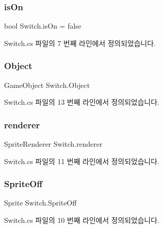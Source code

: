 \subsubsection{\texorpdfstring{isOn}{isOn}}
{\footnotesize\ttfamily bool Switch.\+is\+On = false}



Switch.\+cs 파일의 7 번째 라인에서 정의되었습니다.

\mbox{\label{class_switch_a0d13004c1df964c597024b601235f679}} 
\subsubsection{\texorpdfstring{Object}{Object}}
{\footnotesize\ttfamily Game\+Object Switch.\+Object}



Switch.\+cs 파일의 13 번째 라인에서 정의되었습니다.

\mbox{\label{class_switch_ae41569b4d13a765d054274eb2631016f}} 
\subsubsection{\texorpdfstring{renderer}{renderer}}
{\footnotesize\ttfamily Sprite\+Renderer Switch.\+renderer\hspace{0.3cm}{\ttfamily [private]}}



Switch.\+cs 파일의 11 번째 라인에서 정의되었습니다.

\mbox{\label{class_switch_a6e98de87792cc468654d8aa0d2beede6}} 
\subsubsection{\texorpdfstring{SpriteOff}{SpriteOff}}
{\footnotesize\ttfamily Sprite Switch.\+Sprite\+Off}



Switch.\+cs 파일의 10 번째 라인에서 정의되었습니다.

\mbox{\label{class_switch_adbf1538e9ec1b9eee4f7ca41ecc33db2}} 
